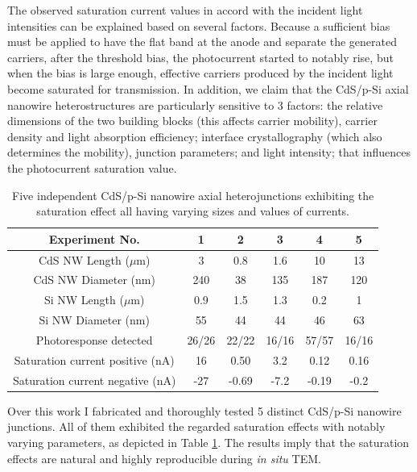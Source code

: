 The observed saturation current values in accord with the incident light intensities can be explained based on several factors. Because a sufficient bias must be applied to have the flat band at the anode and separate the generated carriers, after the threshold bias, the photocurrent started to notably rise, but when the bias is large enough, effective carriers produced by the incident light become saturated for transmission. In addition, we claim that the CdS/p-Si axial nanowire heterostructures are particularly sensitive to 3 factors: the relative dimensions of the two building blocks (this affects carrier mobility), carrier density and light absorption efficiency; interface crystallography (which also determines the mobility), junction parameters; and light intensity; that influences the photocurrent saturation value. 

\begin{table}[ht]
\centering
\begin{tabular}{|c|c|c|c|c|c|}
\hline
Experiment No. & 1 & 2 & 3 & 4 & 5\\
\hline
CdS NW Length ($\mu$m) & 3 & 0.8 & 1.6 & 10 & 13\\
CdS NW Diameter (nm) & 240 & 38 & 135 & 187 & 120\\
Si NW Length ($\mu$m) & 0.9 & 1.5 & 1.3 & 0.2 & 1\\
Si NW Diameter (nm) & 55 & 44 & 44 & 46 & 63\\
Photoresponse detected & 26/26 & 22/22 & 16/16 & 57/57 & 16/16\\
Saturation current positive (nA) & 16 & 0.50 & 3.2 & 0.12 & 0.16\\
Saturation current negative (nA) & -27 & -0.69 & -7.2 & -0.19 & -0.2\\
\hline
\end{tabular}
\caption[Reproducibility of the saturation effect]{Five independent CdS/p-Si nanowire axial heterojunctions exhibiting the saturation effect all having varying sizes and values of currents. 
\label{table:3_1}}
\end{table}

Over this work I fabricated and thoroughly tested 5 distinct CdS/p-Si nanowire junctions. All of them exhibited the regarded saturation effects with notably varying parameters, as depicted in Table \ref{table:3_1}. The results imply that the saturation effects are natural and highly reproducible during \emph{in situ} TEM. 

